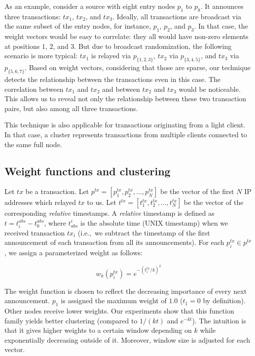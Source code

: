As an example, consider a source with eight entry nodes $p_1$ to $p_8$.
It announces three transactions: $tx_1$, $tx_2$, and $tx_3$.
Ideally, all transactions are broadcast via the same subset of the entry nodes, for instance, $p_1$, $p_2$, and $p_3$.
In that case, the weight vectors would be easy to correlate: they all would have non-zero elements at positions $1$, $2$, and $3$.
But due to broadcast randomization, the following scenario is more typical: $tx_1$ is relayed via $p_{\{1,2,3\}}$, $tx_2$ via $p_{\{3,4,5\}}$, and $tx_3$ via $p_{\{5,6,7\}}$.
Based on weight vectors, considering that those are sparse, our technique detects the relationship between the transactions even in this case.
The correlation between $tx_1$ and $tx_2$ and between $tx_2$ and $tx_3$ would be noticeable.
This allows us to reveal not only the relationship between these two transaction pairs, but also among all three transactions.

This technique is also applicable for transactions originating from a light client.
In that case, a cluster represents transactions from multiple clients connected to the same full node.


\subsection{Weight functions and clustering}

Let $tx$ be a transaction.
Let $p^{tx} = [p^{tx}_1, p^{tx}_2, \dots, p^{tx}_N]$ be the vector of the first $N$ IP addresses which relayed $tx$ to us.
Let $t^{tx} = [t^{tx}_1, t^{tx}_2, \dots, t^{tx}_N]$ be the vector of the corresponding \textit{relative} timestamps.
A \textit{relative} timestamp is defined as $t = t^{abs}_i - t^{abs}_0$, where $t_{abs}^i$ is the absolute time (UNIX timestamp) when we received transaction $tx_i$ (i.e.,~we subtract the timestamp of the first announcement of each transaction from all its announcements).
For each $p^{tx}_i \in p^{tx}$, we assign a parameterized weight as follows:

\[
w_k(p^{tx}_i) = e^{-(t^{tx}_i/k)^2}
\]

The weight function is chosen to reflect the decreasing importance of every next announcement.
$p_1$ is assigned the maximum weight of $1.0$ ($t_1=0$ by definition).
Other nodes receive lower weights.
Our experiments show that this function family yields better clustering (compared to $1/(kt)$ and $e^{-kt}$).
The intuition is that it gives higher weights to a certain window depending on $k$ while exponentially decreasing outside of it.
Moreover, window size is adjusted for each vector.

